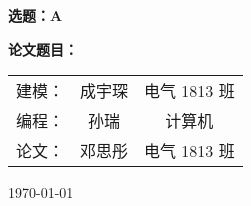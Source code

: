 \begin{titlepage}
  \begin{center}
    \vspace*{\fill}
    {\bfseries 选题：A}
    \vspace*{\fill}

    {\bfseries 论文题目：}

    \itshape
    \begin{tabular}{ccc}
      建模：& 成宇琛 & 电气 1813 班 \\
      编程：& 孙瑞 & 计算机 \\
      论文：& 邓思彤 & 电气 1813 班 \\
    \end{tabular}

    \today
  \end{center}
\end{titlepage}